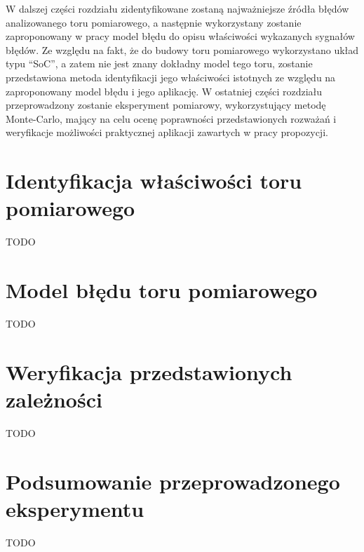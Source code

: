 W dalszej części rozdziału zidentyfikowane zostaną najważniejsze źródła błędów analizowanego toru pomiarowego, a następnie wykorzystany zostanie zaproponowany w pracy model błędu do opisu właściwości wykazanych sygnałów błędów. Ze względu na fakt, że do budowy toru pomiarowego wykorzystano układ typu \enquote{SoC}, a zatem nie jest znany dokładny model tego toru, zostanie przedstawiona metoda identyfikacji jego właściwości istotnych ze względu na zaproponowany model błędu i jego aplikację. W ostatniej części rozdziału przeprowadzony zostanie eksperyment pomiarowy, wykorzystujący metodę Monte-Carlo, mający na celu ocenę poprawności przedstawionych rozważań i weryfikacje możliwości praktycznej aplikacji zawartych w pracy propozycji.

\section{Identyfikacja właściwości toru pomiarowego}

TODO

\section{Model błędu toru pomiarowego}

TODO

\section{Weryfikacja przedstawionych zależności}

TODO

\section{Podsumowanie przeprowadzonego eksperymentu}

TODO

